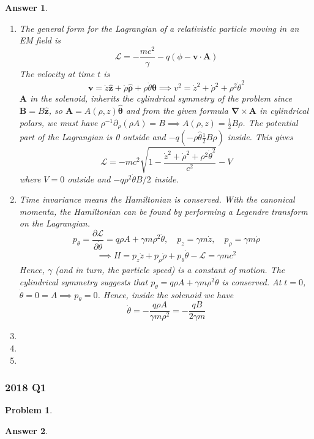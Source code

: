 \documentclass[a4paper]{article}
\newtheorem{ans}{Answer}[section]
\theoremstyle{new}
\newtheorem{qns}{Problem}[section]
\begin{document}
\begin{ans}\leavevmode
\begin{enumerate}[label=(\alph*)]
\item The general form for the Lagrangian of a relativistic particle moving in an EM field is
$$\mathcal{L}=-\frac{mc^2}{\gamma}-q(\phi-\mathbf{v}\cdot\mathbf{A})$$
The velocity at time $t$ is
$$\mathbf{v}=\dot{z}\mathbf{\hat{z}}+\dot{\rho}\boldsymbol{\hat{\rho}}+\rho\dot{\theta}\boldsymbol{\hat{\theta}}\implies v^2=\dot{z}^2+\dot{\rho}^2+\rho^2\dot{\theta}^2$$
$\mathbf{A}$ in the solenoid, inherits the cylindrical symmetry of the problem since $\mathbf{B}=B\mathbf{\hat{z}}$, so $\mathbf{A}=A(\rho,z)\boldsymbol{\hat{\theta}}$ and from the given formula $\boldsymbol{\nabla}\times\mathbf{A}$ in cylindrical polars, we must have $\rho^{-1}\partial_\rho(\rho A)=B\implies A(\rho,z)=\frac{1}{2}B\rho$. The potential part of the Lagrangian is 0 outside and $-q(-\rho\hat{\theta}\frac{1}{2}B\rho)$ inside. This gives 
$$\mathcal{L}=-mc^2\sqrt{1-\frac{\dot{z}^2+\dot{\rho}^2+\rho^2\dot{\theta}^2}{c^2}}-V$$
where $V=0$ outside and $-q\rho^2\dot{\theta}B/2$ inside.
\item Time invariance means the Hamiltonian is conserved. With the canonical momenta, the Hamiltonian can be found by performing a Legendre transform on the Lagrangian.
$$p_\theta=\frac{\partial\mathcal{L}}{\partial\dot{\theta}}=q\rho A+\gamma m\rho^2\dot{\theta},\quad p_z=\gamma m\dot{z},\quad p_\rho=\gamma m\dot{\rho}$$
$$\implies H=p_z\dot{z}+p_\rho\dot{\rho}+p_\theta\dot{\theta}-\mathcal{L}=\gamma mc^2$$
Hence, $\gamma$ (and in turn, the particle speed) is a constant of motion. The cylindrical symmetry suggests that $p_\theta=q\rho A+\gamma m\rho^2\dot{\theta}$ is conserved. At $t=0$, $\dot{\theta}=0=A\implies p_\theta=0$. Hence, inside the solenoid we have
$$\dot{\theta}=-\frac{q\rho A}{\gamma m\rho^2}=-\frac{qB}{2\gamma m}$$

\item 

\item 

\item
\end{enumerate}
\end{ans}
\subsubsection*{2018 Q1}
\begin{qns}

\end{qns}
\begin{ans}

\end{ans}
\newpage
\end{document}

